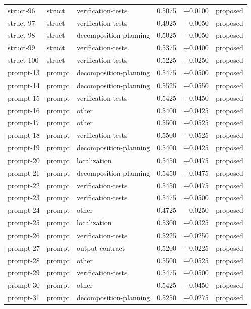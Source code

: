 \begin{center}
\begin{longtable}{llp{5.2cm}rrl}
struct-96 & struct & verification-tests & 0.5075 & +0.0100 & proposed \\
struct-97 & struct & verification-tests & 0.4925 & -0.0050 & proposed \\
struct-98 & struct & decomposition-planning & 0.5025 & +0.0050 & proposed \\
struct-99 & struct & verification-tests & 0.5375 & +0.0400 & proposed \\
struct-100 & struct & verification-tests & 0.5225 & +0.0250 & proposed \\
prompt-13 & prompt & decomposition-planning & 0.5475 & +0.0500 & proposed \\
prompt-14 & prompt & decomposition-planning & 0.5525 & +0.0550 & proposed \\
prompt-15 & prompt & verification-tests & 0.5425 & +0.0450 & proposed \\
prompt-16 & prompt & other & 0.5400 & +0.0425 & proposed \\
prompt-17 & prompt & other & 0.5500 & +0.0525 & proposed \\
prompt-18 & prompt & verification-tests & 0.5500 & +0.0525 & proposed \\
prompt-19 & prompt & decomposition-planning & 0.5400 & +0.0425 & proposed \\
prompt-20 & prompt & localization & 0.5450 & +0.0475 & proposed \\
prompt-21 & prompt & decomposition-planning & 0.5450 & +0.0475 & proposed \\
prompt-22 & prompt & verification-tests & 0.5450 & +0.0475 & proposed \\
prompt-23 & prompt & verification-tests & 0.5475 & +0.0500 & proposed \\
prompt-24 & prompt & other & 0.4725 & -0.0250 & proposed \\
prompt-25 & prompt & localization & 0.5300 & +0.0325 & proposed \\
prompt-26 & prompt & verification-tests & 0.5225 & +0.0250 & proposed \\
prompt-27 & prompt & output-contract & 0.5200 & +0.0225 & proposed \\
prompt-28 & prompt & other & 0.5500 & +0.0525 & proposed \\
prompt-29 & prompt & verification-tests & 0.5475 & +0.0500 & proposed \\
prompt-30 & prompt & other & 0.5425 & +0.0450 & proposed \\
prompt-31 & prompt & decomposition-planning & 0.5250 & +0.0275 & proposed \\

\end{longtable}
\end{center}
